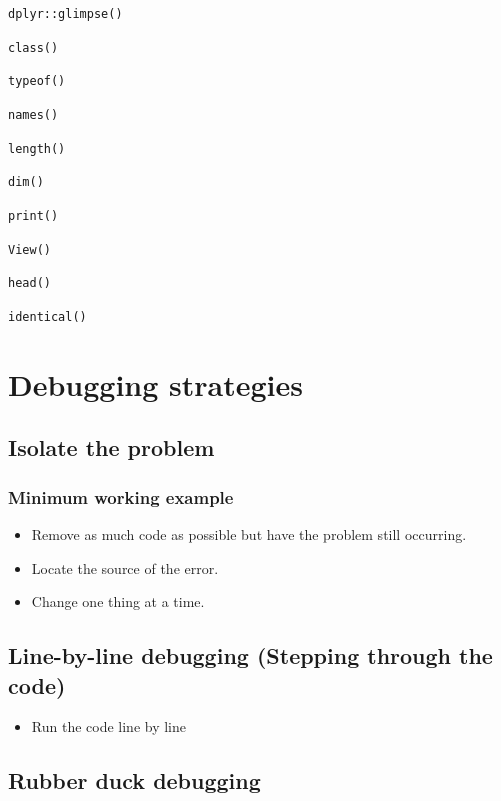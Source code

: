 \documentclass[]{book}
\providecommand{\tightlist}{%
  \setlength{\itemsep}{0pt}\setlength{\parskip}{0pt}}
\begin{document}
\texttt{dplyr::glimpse()}

\texttt{class()}

\texttt{typeof()}

\texttt{names()}

\texttt{length()}

\texttt{dim()}

\texttt{print()}

\texttt{View()}

\texttt{head()}

\texttt{identical()}

\hypertarget{debugging-strategies}{%
\chapter{Debugging strategies}\label{debugging-strategies}}

\hypertarget{isolate-the-problem}{%
\section{Isolate the problem}\label{isolate-the-problem}}

\hypertarget{minimum-working-example}{%
\subsection{Minimum working example}\label{minimum-working-example}}

\begin{itemize}
\tightlist
\item
  Remove as much code as possible but have the problem still occurring.
\item
  Locate the source of the error.
\item
  Change one thing at a time.
\end{itemize}

\hypertarget{line-by-line-debugging-stepping-through-the-code}{%
\section{Line-by-line debugging (Stepping through the code)}\label{line-by-line-debugging-stepping-through-the-code}}

\begin{itemize}
\tightlist
\item
  Run the code line by line
\end{itemize}

\hypertarget{rubber-duck-debugging}{%
\section{Rubber duck debugging}\label{rubber-duck-debugging}}
\end{document}
